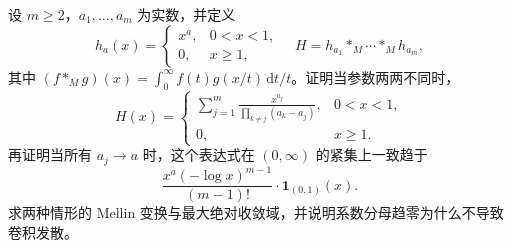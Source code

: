 \begin{exercise}[不同指数的卷积与合并极限]\label{b3:ex:21-7}
设 \(m\ge2\)，\(a_1,\ldots,a_m\) 为实数，并定义
\[
 h_a(x)=
 \begin{cases}
 x^a,&0<x<1,\\
 0,&x\ge1,
 \end{cases}
 \quad H=h_{a_1}*_M\cdots*_Mh_{a_m},
\]
其中 \((f*_Mg)(x)=\int_0^\infty f(t)g(x/t)\,\mathrm{d}t/t\)。证明当参数两两不同时，
\[
 H(x)=
 \begin{cases}
 \displaystyle\sum_{j=1}^m
 \frac{x^{a_j}}{\prod_{k\ne j}(a_k-a_j)},&0<x<1,\\
 0,&x\ge1.
 \end{cases}
\]
再证明当所有 \(a_j\to a\) 时，这个表达式在 \((0,\infty)\) 的紧集上一致趋于
\[
 \frac{x^a(-\log x)^{m-1}}{(m-1)!}\cdot\mathbf1_{(0,1)}(x).
\]
求两种情形的 Mellin 变换与最大绝对收敛域，并说明系数分母趋零为什么不导致卷积发散。
\end{exercise}
